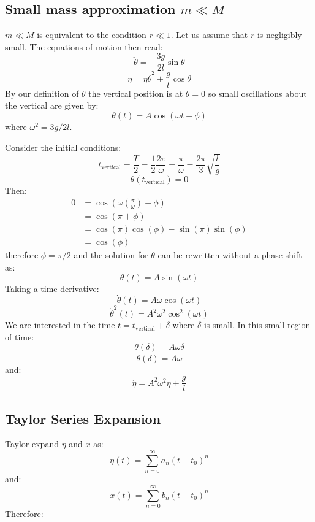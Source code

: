 \documentclass[9pt]{report}
\begin{document}
\begin{enumerate}
\subsection{Small mass approximation $m \ll M$}
$m \ll M$ is equivalent to the condition $r \ll 1$. Let us assume that $r$ is
negligibly small. The equations of motion then read:
\begin{equation}
\ddot{\theta} = -\frac{3g}{2l} \sin \theta \label{small_r_el_theta}
\end{equation}
\begin{equation}
\ddot{\eta} = \eta \dot{\theta}^2 \label{small_r_el_eta} + \frac{g}{l} \cos \theta
\end{equation}
By our definition of $\theta$ the vertical position is at $\theta = 0$ so small
oscillations about the vertical are given by:
\[
\theta(t) = A \cos (\omega t + \phi)
\]
where $\omega^2 = 3 g / 2 l$.

Consider the initial conditions:
\[
  t_\text{vertical} = \frac{T}{2} = \frac{1}{2} \frac{2\pi}{\omega} = \frac{\pi}{\omega} = \frac{2\pi}{3}\sqrt{\frac{l}{g}}
\]  
\[
 \theta(t_\text{vertical}) = 0
\]
Then:
\[
\begin{align}
0 &= \cos(\omega (\frac{\pi}{\omega}) + \phi) \\
  &= \cos(\pi + \phi)\\
  &= \cos(\pi)\cos(\phi)-\sin(\pi)\sin(\phi)\\
  &= \cos(\phi)
\end{align}
\]
therefore $\phi = \pi/2$ and the solution for $\theta$ can be rewritten without
a phase shift as:
\[
  \theta(t) = A \sin(\omega t)
\]
Taking a time derivative:
\[
\dot{\theta}(t) = A\omega \cos (\omega t)
\]
\[
\dot{\theta}^2(t) = A^2\omega^2 \cos^2 (\omega t)
\]
We are interested in the time $t = t_\text{vertical} + \delta$ where $\delta$ is
small. In this small region of time:
\[
  \theta (\delta) = A\omega \delta 
\]
\[
  \dot{\theta} (\delta) = A \omega
\]
and:
\[
  \ddot{\eta} = A^2 \omega^2 \eta + \frac{g}{l}
\]
\subsection{Taylor Series Expansion}
Taylor expand $\eta$ and $x$ as:
\[
  \eta(t) = \sum_{n=0}^\infty a_n (t-t_0)^n
\]
and:
\[
  x(t) = \sum_{n=0}^\infty b_n (t-t_0)^n
\]
Therefore:
\end{enumerate}
\end{document}
